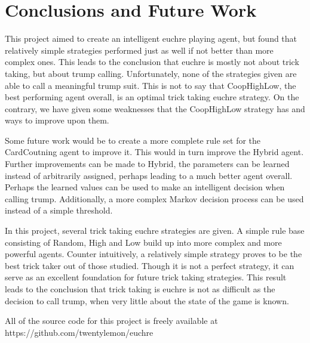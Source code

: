 
\section{Conclusions and Future Work}

This project aimed to create an intelligent euchre playing agent, but found that relatively simple strategies performed
just as well if not better than more complex ones. This leads to the conclusion that euchre is mostly not about trick taking,
but about trump calling. Unfortunately, none of the strategies given are able to call a meaningful trump suit. This is not to say
that CoopHighLow, the best performing agent overall, is an optimal trick taking euchre strategy. On the contrary, we have given some
weaknesses that the CoopHighLow strategy has and ways to improve upon them.

Some future work would be to create a more complete rule set for the CardCoutning agent to improve it. This would in turn improve
the Hybrid agent. Further improvements can be made to Hybrid, the parameters can be learned instead of arbitrarily assigned, perhaps
leading to a much better agent overall. Perhaps the learned values can be used to make an intelligent decision when calling trump.
Additionally, a more complex Markov decision process can be used instead of a simple threshold.

In this project, several trick taking euchre strategies are given. A simple rule base consisting of Random, High and Low build
up into more complex and more powerful agents. Counter intuitively, a relatively simple strategy proves to be the best trick taker
out of those studied. Though it is not a perfect strategy, it can serve as an excellent foundation for future trick taking strategies.
This result leads to the conclusion that trick taking is euchre is not as difficult as the decision to call trump, when very little
about the state of the game is known.

All of the source code for this project is freely available at\\https://github.com/twentylemon/euchre
